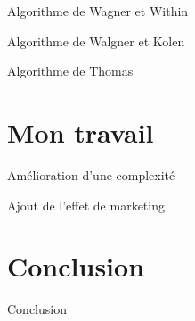 \documentclass{beamer}
\begin{document}
\begin{frame}{Algorithme de Wagner et Within}
\end{frame}

\begin{frame}{Algorithme de Walgner et Kolen}
\end{frame}

\begin{frame}{Algorithme de Thomas}
\end{frame}

\section{Mon travail}
\begin{frame}{Amélioration d'une complexité}
\end{frame}

\begin{frame}{Ajout de l'effet de marketing}
\end{frame}

\section{Conclusion}
\begin{frame}{Conclusion}
\end{frame}
\end{document}
